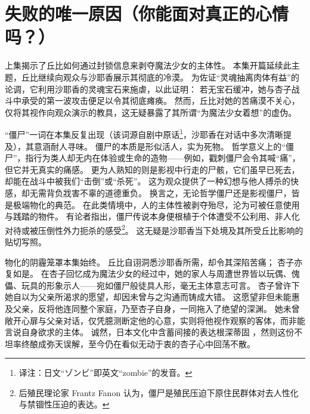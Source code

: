 \chapter[失败的唯一原因（你能面对真正的心情吗？）]{失败的唯一原因\protect\footnotemark（你能面对真正的心情吗？）}

上集揭示了丘比如何通过封锁信息来剥夺魔法少女的主体性。
本集开篇延续此主题，丘比继续向观众与沙耶香展示其彻底的冷漠。
为佐证“灵魂抽离肉体有益”的论调，它利用沙耶香的灵魂宝石来施虐，以此证明：
若无宝石缓冲，她与杏子战斗中承受的第一波攻击便足以令其彻底瘫痪。
然而，丘比对她的苦痛漠不关心，仅将其视作向观众演示的教具，这无疑暴露了其所谓“为魔法少女着想”的虚伪。

“僵尸”一词在本集反复出现（该词源自剧中原话\footnote{%
    译注：日文“ゾンビ”即英文“zombie”的发音。
}，沙耶香在对话中多次清晰提及），其意涵耐人寻味。
僵尸的本质是形似活人，实为死物。
哲学意义上的“僵尸”，指行为类人却无内在体验或生命的造物——例如，戳刺僵尸会令其喊“痛”，但它并无真实的痛感\cite{ref39}。
更为人熟知的则是影视中行走的尸骸，它们虽早已死去，却能在战斗中被我们“击倒”或“杀死”。
这为观众提供了一种幻想与他人搏杀的快感，却无需背负戕害不辜的道德重负\cite{ref40}。
换言之，无论哲学僵尸还是影视僵尸，皆是极端物化的典范。
在此类情境中，人的主体性被剥夺殆尽，沦为可被任意使用与践踏的物件。
有论者指出，僵尸传说本身便根植于个体遭受不公利用、非人化对待或被压倒性外力扼杀的感受\footnote{%
    后殖民理论家 Frantz Fanon 认为，僵尸是殖民压迫下原住民群体对去人性化与禁锢性压迫的表达。
}\cite{ref41}。
这无疑是沙耶香当下处境及其所受丘比影响的贴切写照。

物化的阴霾笼罩本集始终。
丘比自诩洞悉沙耶香所需，却令其深陷苦痛；
杏子亦复如是。
在杏子回忆成为魔法少女的经过中，她的家人与周遭世界皆以玩偶、傀儡、玩具的形象示人——宛如僵尸般徒具人形，毫无主体意志可言。
杏子曾许下她自以为父亲所渴求的愿望，却因未曾与之沟通而铸成大错。
这愿望非但未能惠及父亲，反将他连同整个家庭，乃至杏子自身，一同拖入了绝望的深渊。
她未曾敞开心扉与父亲对话，仅凭臆测断定他的心意，实则将他视作观察的客体，而非能言说自身欲求的主体。
诚然，日本文化中含蓄间接的表达根深蒂固 \cite{ref42}，然则这份不坦率终酿成弥天误解，至今仍在看似无动于衷的杏子心中回荡不散。

